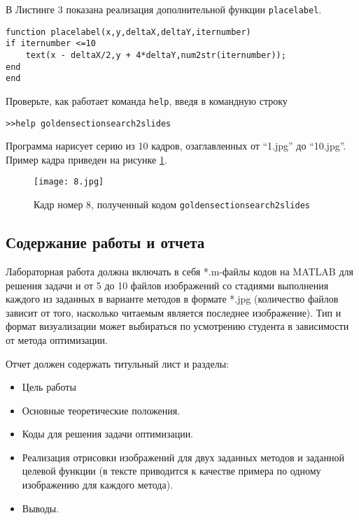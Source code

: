 \documentclass[a4paper,12pt]{article}
\begin{document}
В Листинге 3 показана реализация дополнительной функции \lstinline[style=Matlab-editor]{placelabel}.

\begin{lstlisting}[style=Matlab-editor, caption=Функция установки меток с нумерацией итераций] 
function placelabel(x,y,deltaX,deltaY,iternumber)
if iternumber <=10
    text(x - deltaX/2,y + 4*deltaY,num2str(iternumber));
end
end
\end{lstlisting}

Проверьте, как работает команда \lstinline[style=Matlab-editor]{help}, введя в командную строку

\lstinline[style=Matlab-editor]{>>help goldensectionsearch2slides}

Программа нарисует серию из 10 кадров, озаглавленных от ``1.jpg'' до ``10.jpg''. Пример кадра приведен на рисунке \ref{fig1}.

\begin{figure}
	\centering
	\texttt{[image: 8.jpg]}
	\caption{Кадр номер 8, полученный кодом \texttt{goldensectionsearch2slides}}
	\label{fig1}
\end{figure}

\subsection*{Содержание работы и отчета}

Лабораторная работа должна включать в себя *.m-файлы кодов на MATLAB для решения задачи и от 5 до 10 файлов изображений со стадиями выполнения каждого из заданных в варианте методов в формате *.jpg (количество файлов зависит от того, насколько читаемым является последнее изображение). Тип и формат визуализации может выбираться по усмотрению студента в зависимости от метода оптимизации. 

Отчет должен содержать титульный лист и разделы:

\begin{itemize}
\item Цель работы

\item Основные теоретические положения. 

\item Коды для решения задачи оптимизации.

\item Реализация отрисовки изображений для двух заданных методов и заданной целевой функции (в тексте приводится к качестве примера по одному изображению для каждого метода).

\item Выводы.
\end{itemize}
\end{document}

